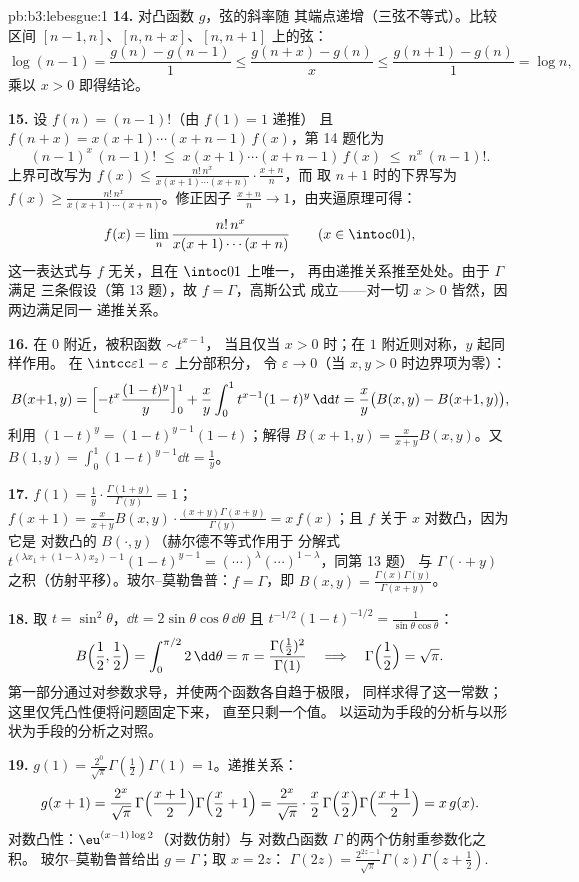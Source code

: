 \begin{solution}{pb:b3:lebesgue:1}
\textbf{14.} 对凸函数 $g$，弦的斜率随
其端点递增（三弦不等式）。比较
区间 $[n-1, n]$、$[n, n+x]$、$[n, n+1]$ 上的弦：
\[
\log(n-1) = \frac{g(n) - g(n-1)}1 \leq
\frac{g(n+x) - g(n)}x \leq \frac{g(n+1) - g(n)}1 = \log n,
\]
乘以 $x > 0$ 即得结论。

\textbf{15.} 设 $f(n) = (n-1)!$（由 $f(1) = 1$ 递推）
且 $f(n + x) = x(x+1)\cdots(x+n-1)\,f(x)$，第 14 题化为
\[
(n-1)^x\,(n-1)! \;\leq\; x(x+1)\cdots(x+n-1)\,f(x)
\;\leq\; n^x\,(n-1)! .
\]
上界可改写为 $f(x) \leq
\frac{n!\,n^x}{x(x+1)\cdots(x+n)}\cdot\frac{x+n}n$，而
取 $n+1$ 时的下界写为 $f(x) \geq
\frac{n!\,n^x}{x(x+1)\cdots(x+n)}$。修正因子
$\frac{x+n}n \to 1$，由夹逼原理可得：
\[
f(x) = \lim_n\frac{n!\,n^x}{x(x+1)\cdots(x+n)}
\qquad (x \in \intoc01),
\]
这一表达式与 $f$ 无关，且在 $\intoc01$ 上唯一，
再由递推关系推至处处。由于 $\Gamma$ 满足
三条假设（第 13 题），故 $f = \Gamma$，高斯公式
成立——对一切 $x > 0$ 皆然，因两边满足同一
递推关系。

\textbf{16.} 在 $0$ 附近，被积函数 $\sim t^{x-1}$，
当且仅当 $x > 0$ 时；在 $1$ 附近则对称，$y$ 起同样作用。
在 $\intcc\varepsilon{1-\varepsilon}$ 上分部积分，
令 $\varepsilon \to 0$（当 $x, y >
0$ 时边界项为零）：
\[
B(x{+}1, y) = \Bigl[-t^x\frac{(1-t)^y}y\Bigr]_0^1 +
\frac xy\int_0^1t^{x-1}(1-t)^y\,\dd t
= \frac xy\bigl(B(x, y) - B(x{+}1, y)\bigr),
\]
利用 $(1-t)^y = (1-t)^{y-1}(1 - t)$；解得 $B(x+1, y) =
\frac{x}{x+y}B(x, y)$。又 $B(1, y) =
\int_0^1(1-t)^{y-1}\dd t = \frac1y$。

\textbf{17.} $f(1) = \frac1y\cdot\frac{\Gamma(1+y)}{\Gamma(y)}
= 1$；$f(x+1) = \frac{x}{x+y}B(x,y)\cdot\frac{(x+y)\Gamma(x+y)}
{\Gamma(y)} = x\,f(x)$；且 $f$ 关于 $x$ 对数凸，因为它是
对数凸的 $B(\cdot, y)$（赫尔德不等式作用于
分解式 $t^{(\lambda x_1 + (1-\lambda)x_2)-1}(1-t)^{y-1}
= (\cdots)^\lambda(\cdots)^{1-\lambda}$，同第 13 题）
与 $\Gamma(\cdot + y)$ 之积（仿射平移）。玻尔--莫勒鲁普：$f =
\Gamma$，即 $B(x, y) =
\frac{\Gamma(x)\Gamma(y)}{\Gamma(x+y)}$。

\textbf{18.} 取 $t = \sin^2\theta$，$\dd t =
2\sin\theta\cos\theta\,\dd\theta$ 且 $t^{-1/2}(1-t)^{-1/2} =
\frac1{\sin\theta\cos\theta}$：
\[
B\Bigl(\frac12, \frac12\Bigr) =
\int_0^{\pi/2}2\,\dd\theta = \pi
= \frac{\Gamma(\frac12)^2}{\Gamma(1)}
\quad\Longrightarrow\quad
\Gamma\Bigl(\frac12\Bigr) = \sqrt\pi .
\]
第一部分通过对参数求导，并使两个函数各自趋于极限，
同样求得了这一常数；这里仅凭凸性便将问题固定下来，
直至只剩一个值。
以运动为手段的分析与以形状为手段的分析之对照。

\textbf{19.} $g(1) = \frac{2^0}{\sqrt\pi}\Gamma(\frac12)
\Gamma(1) = 1$。递推关系：
\[
g(x+1) = \frac{2^{x}}{\sqrt\pi}\,
\Gamma\Bigl(\frac{x+1}2\Bigr)\Gamma\Bigl(\frac x2 + 1\Bigr)
= \frac{2^{x}}{\sqrt\pi}\cdot\frac x2\,
\Gamma\Bigl(\frac x2\Bigr)\Gamma\Bigl(\frac{x+1}2\Bigr)
= x\,g(x) .
\]
对数凸性：$\eu^{(x-1)\log2}$（对数仿射）与
对数凸函数 $\Gamma$ 的两个仿射重参数化之积。
玻尔--莫勒鲁普给出 $g = \Gamma$；取 $x = 2z$：
$\Gamma(2z) = \frac{2^{2z-1}}{\sqrt\pi}\Gamma(z)\Gamma(z +
\frac12)$.


\end{solution}
